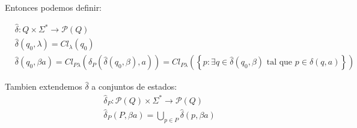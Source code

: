 Entonces podemos definir:

\begin{align*}
   & \hat\delta: Q \times \Sigma^* \to \mathcal{P}(Q)                                                                                                                                                             \\
   & \hat\delta(q_0,\lambda) = Cl_\lambda(q_0)                                                                                                                                                                    \\
   & \hat\delta(q_0, \beta a) = Cl_{P\lambda}\left(\delta_P(\hat\delta(q_0,\beta), a)\right) = Cl_{P\lambda}\left(\left\{ p: \exists q\in \hat\delta(q_0,\beta) \text{ tal que } p\in \delta(q,a) \right\}\right)
\end{align*}

Tambien extendemos \(\hat\delta\) a conjuntos de estados:
\begin{align*}
   & \hat\delta_P: \mathcal{P}(Q) \times \Sigma^* \to \mathcal{P}(Q)  \\
   & \hat\delta_P(P,\beta a) = \bigcup_{p\in P} \hat\delta(p,\beta a)
\end{align*}




